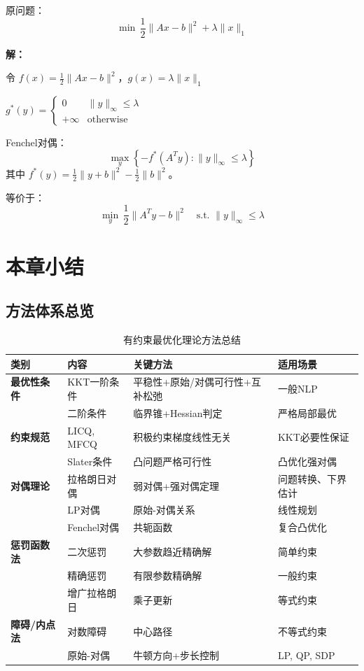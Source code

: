 \begin{example}
原问题：
\[
\min \, \frac{1}{2}\|Ax - b\|^2 + \lambda\|x\|_1
\]

\textbf{解：}

令 $f(x) = \frac{1}{2}\|Ax - b\|^2$，$g(x) = \lambda\|x\|_1$

$g^*(y) = \begin{cases} 0 & \|y\|_\infty \leq \lambda \\ +\infty & \text{otherwise} \end{cases}$

Fenchel对偶：
\[
\max_y \left\{-f^*(A^T y) : \|y\|_\infty \leq \lambda\right\}
\]
其中 $f^*(y) = \frac{1}{2}\|y + b\|^2 - \frac{1}{2}\|b\|^2$。

等价于：
\[
\min_y \, \frac{1}{2}\|A^T y - b\|^2 \quad \text{s.t. } \|y\|_\infty \leq \lambda
\]
\end{example}

\section{本章小结}\label{sec:ch6-summary}

\subsection{方法体系总览}

\begin{table}[H]
\centering
\caption{有约束最优化理论方法总结}
\begin{tabular}{@{}>{\raggedright\arraybackslash}p{2.8cm}>{\raggedright\arraybackslash}p{3.2cm}>{\raggedright\arraybackslash}p{3.5cm}>{\raggedright\arraybackslash}p{3.5cm}@{}}
\toprule
\textbf{类别} & \textbf{内容} & \textbf{关键方法} & \textbf{适用场景} \\
\midrule
\textbf{最优性条件}  & KKT一阶条件 & 平稳性+原始/对偶可行性+互补松弛 & 一般NLP \\
 & 二阶条件 & 临界锥+Hessian判定 & 严格局部最优 \\
\midrule
\textbf{约束规范} 
 & LICQ, MFCQ & 积极约束梯度线性无关 & KKT必要性保证 \\
 & Slater条件 & 凸问题严格可行性 & 凸优化强对偶 \\
\midrule
\textbf{对偶理论} 
 & 拉格朗日对偶 & 弱对偶+强对偶定理 & 问题转换、下界估计 \\
 & LP对偶 & 原始-对偶关系 & 线性规划 \\
 & Fenchel对偶 & 共轭函数 & 复合凸优化 \\
\midrule
\textbf{惩罚函数法} 
 & 二次惩罚 & 大参数趋近精确解 & 简单约束 \\
 & 精确惩罚 & 有限参数精确解 & 一般约束 \\
 & 增广拉格朗日 & 乘子更新 & 等式约束 \\
\midrule
\textbf{障碍/内点法} 
 & 对数障碍 & 中心路径 & 不等式约束 \\
 & 原始-对偶 & 牛顿方向+步长控制 & LP, QP, SDP \\
\bottomrule
\end{tabular}
\end{table}


